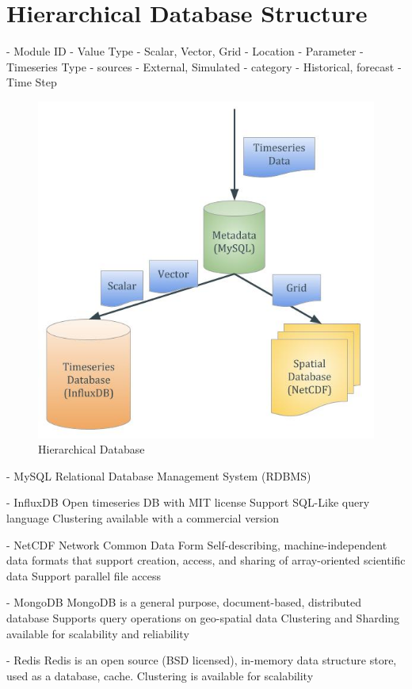 \section{Hierarchical Database Structure}

- Module ID
- Value Type
  - Scalar, Vector, Grid
- Location 
- Parameter
- Timeseries Type
  - sources - External, Simulated
  - category - Historical, forecast
- Time Step

\begin{figure}[htp]
    \centering
    \includegraphics[width=1\textwidth]{method/microservice/hierarchical_database.jpg}
    \caption{Hierarchical Database}
    \label{fi:hierarchical_database}
\end{figure}

- MySQL
Relational Database Management System (RDBMS)

- InfluxDB \cite{influxdbInfluxDBDocumentation}
Open timeseries DB with MIT license
Support SQL-Like query language
Clustering available with a commercial version

- NetCDF \cite{unidataUnidataNetCDF}
Network Common Data Form
Self-describing, machine-independent data formats that support creation, access, and sharing of array-oriented scientific data
Support parallel file access

- MongoDB
  MongoDB is a general purpose, document-based, distributed database
  Supports query operations on geo-spatial data \cite{mongodbMongoDBManual}
  Clustering and Sharding available for scalability and reliability
  
- Redis \cite{redisRedisDocumentation}
  Redis is an open source (BSD licensed), in-memory data structure store, used as a database, cache.
  Clustering is available for scalability
  